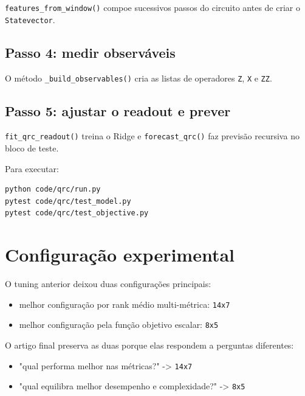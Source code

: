 \documentclass[12pt]{article}
\providecommand{\tightlist}{%
          \setlength{\itemsep}{0pt}\setlength{\parskip}{0pt}}
\begin{document}
\texttt{features\_from\_window()} compoe sucessivos passos do circuito antes de criar o \texttt{Statevector}.

\subsection{Passo 4: medir observáveis}\label{44-passo-4-medir-observuxe1veis}

O método \texttt{\_build\_observables()} cria as listas de operadores \texttt{Z}, \texttt{X} e \texttt{ZZ}.

\subsection{Passo 5: ajustar o readout e prever}\label{45-passo-5-ajustar-o-readout-e-prever}

\texttt{fit\_qrc\_readout()} treina o Ridge e \texttt{forecast\_qrc()} faz previsão recursiva no bloco de teste.

Para executar:

\begin{verbatim}
python code/qrc/run.py
pytest code/qrc/test_model.py
pytest code/qrc/test_objective.py
\end{verbatim}

\section{Configuração experimental}\label{5-configurauxe7uxe3o-experimental}

O tuning anterior deixou duas configurações principais:

\begin{itemize}
\tightlist
\item
  melhor configuração por rank médio multi-métrica: \texttt{14x7}
\item
  melhor configuração pela função objetivo escalar: \texttt{8x5}
\end{itemize}

O artigo final preserva as duas porque elas respondem a perguntas diferentes:

\begin{itemize}
\tightlist
\item
  "qual performa melhor nas métricas?" -\textgreater{} \texttt{14x7}
\item
  "qual equilibra melhor desempenho e complexidade?" -\textgreater{} \texttt{8x5}
\end{itemize}
\end{document}
